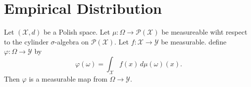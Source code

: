 \chapter{Empirical Distribution}
\begin{lemma}
  \label{lem:random_dist_test_function_measureable_Polish}
  \notready
  Let $(\mathcal{X}, d)$ be a Polish space. Let $\mu : \Omega \to \mathcal{P}(\mathcal{X})$ be measureable wiht respect to the cylinder $\sigma$-algebra on $\mathcal{P}(\mathcal{X})$. Let $f : \mathcal{X} \to \mathcal{Y}$ be measurable. define $\varphi : \Omega \to \mathcal{Y}$ by
  \[
  \varphi(\omega) = \int_{\mathcal{X}}f(x) \, d\mu(\omega)(x).
  \]
  Then $\varphi$ is a measurable map from $\Omega \to \mathcal{Y}$.


\end{lemma}
